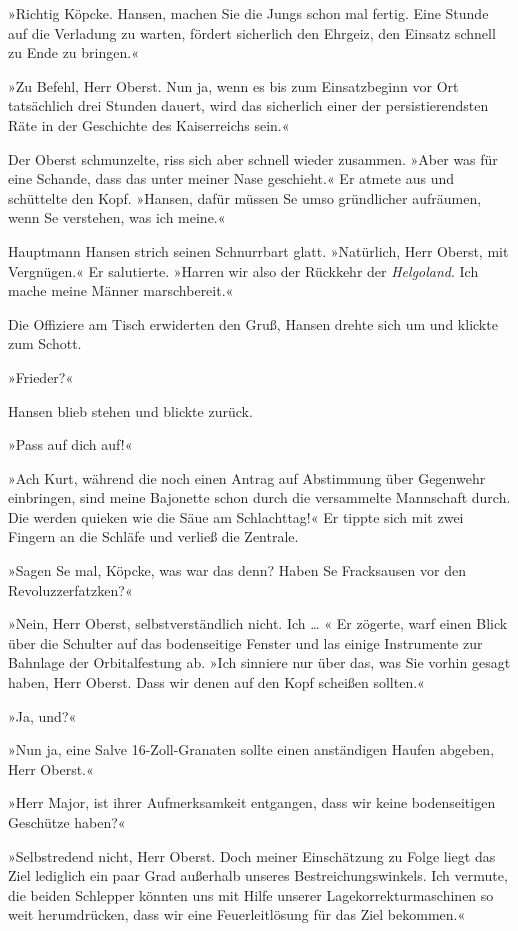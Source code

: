 »Richtig Köpcke. Hansen, machen Sie die Jungs schon mal fertig.
Eine Stunde auf die Verladung zu warten, fördert sicherlich den
Ehrgeiz, den Einsatz schnell zu Ende zu bringen.«

»Zu Befehl, Herr Oberst. Nun ja, wenn es bis zum Einsatzbeginn vor
Ort tatsächlich drei Stunden dauert, wird das sicherlich einer der
persistierendsten Räte in der Geschichte des Kaiserreichs sein.«

Der Oberst schmunzelte, riss sich aber schnell wieder zusammen.
»Aber was für eine Schande, dass das unter meiner Nase geschieht.«
Er atmete aus und schüttelte den Kopf. »Hansen, dafür müssen Se
umso gründlicher aufräumen, wenn Se verstehen, was ich meine.«

Hauptmann Hansen strich seinen Schnurrbart glatt. »Natürlich, Herr
Oberst, mit Vergnügen.« Er salutierte. »Harren wir also der
Rückkehr der \emph{Helgoland}. Ich mache meine Männer
marschbereit.«

Die Offiziere am Tisch erwiderten den Gruß, Hansen drehte sich um
und klickte zum Schott.

»Frieder?«

Hansen blieb stehen und blickte zurück.

»Pass auf dich auf!«

»Ach Kurt, während die noch einen Antrag auf Abstimmung über
Gegenwehr einbringen, sind meine Bajonette schon durch die
versammelte Mannschaft durch. Die werden quieken wie die Säue am
Schlachttag!« Er tippte sich mit zwei Fingern an die Schläfe und
verließ die Zentrale.

»Sagen Se mal, Köpcke, was war das denn? Haben Se Fracksausen vor
den Revoluzzerfatzken?«

»Nein, Herr Oberst, selbstverständlich nicht. Ich … « Er zögerte,
warf einen Blick über die Schulter auf das bodenseitige Fenster und
las einige Instrumente zur Bahnlage der Orbitalfestung ab. »Ich
sinniere nur über das, was Sie vorhin gesagt haben, Herr Oberst.
Dass wir denen auf den Kopf scheißen sollten.«

»Ja, und?«

»Nun ja, eine Salve 16-Zoll-Granaten sollte einen anständigen
Haufen abgeben, Herr Oberst.«

»Herr Major, ist ihrer Aufmerksamkeit entgangen, dass wir keine
bodenseitigen Geschütze haben?«

»Selbstredend nicht, Herr Oberst. Doch meiner Einschätzung zu Folge
liegt das Ziel lediglich ein paar Grad außerhalb unseres
Bestreichungswinkels. Ich vermute, die beiden Schlepper könnten uns
mit Hilfe unserer Lagekorrekturmaschinen so weit herumdrücken, dass
wir eine Feuerleitlösung für das Ziel bekommen.«

